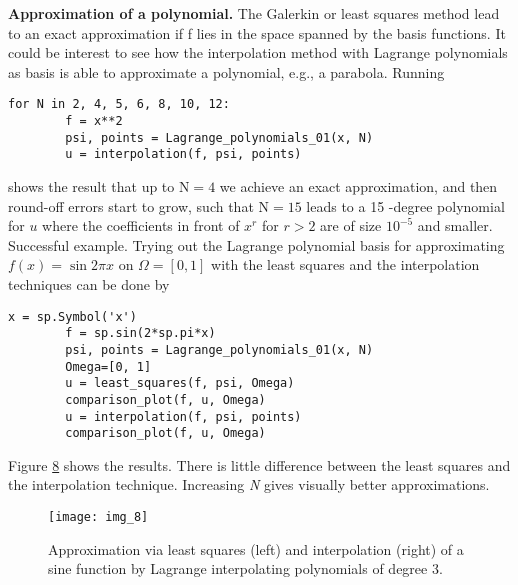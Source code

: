 \documentclass[../main.tex]{subfiles}
\begin{document}
	\noindent \textbf{Approximation of a polynomial.} The Galerkin or least squares method lead
	to an exact approximation if f lies in the space spanned by the basis functions. It
	could be interest to see how the interpolation method with Lagrange polynomials
	as basis is able to approximate a polynomial, e.g., a parabola. Running
	\begin{lstlisting}[numbers=none]
		for N in 2, 4, 5, 6, 8, 10, 12:
		f = x**2
		psi, points = Lagrange_polynomials_01(x, N)
		u = interpolation(f, psi, points)	
	\end{lstlisting}
	shows the result that up to $\mathrm{N}=4$ we achieve an exact approximation, and then round-off errors start to grow, such that $\mathrm{N}=15$ leads to a 15 -degree polynomial for $u$ where the coefficients in front of $x^{r}$ for $r>2$ are of size $10^{-5}$ and smaller.
	Successful example. Trying out the Lagrange polynomial basis for approximating $f(x)=\sin 2 \pi x$ on $\Omega=[0,1]$ with the least squares and the interpolation techniques can be done by
	\begin{lstlisting}[numbers=none]
		x = sp.Symbol('x')
		f = sp.sin(2*sp.pi*x)
		psi, points = Lagrange_polynomials_01(x, N)
		Omega=[0, 1]
		u = least_squares(f, psi, Omega)
		comparison_plot(f, u, Omega)
		u = interpolation(f, psi, points)
		comparison_plot(f, u, Omega)	
	\end{lstlisting}
	Figure \hyperref[fig:img_8]{8} shows the results. There is little difference between the least squares and
	the interpolation technique. Increasing \textit{N} gives visually better approximations.
	\begin{figure}[H]
		\centering
		\texttt{[image: img\_8]}
		\caption{Approximation via least squares (left) and interpolation (right) of a
			sine function by Lagrange interpolating polynomials of degree 3.}
		\label{fig:img_8}
	\end{figure}	
	
\end{document}
